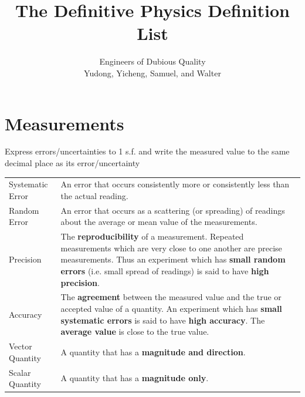 \documentclass[a4paper,11pt]{article}
\title{The Definitive Physics Definition List}
\author{Engineers of Dubious Quality\\Yudong, Yicheng, Samuel, and Walter}
\begin{document}
	
	\maketitle
	
	\section{Measurements}
	Express errors/uncertainties to 1 s.f. and write the measured value to the same decimal place as its error/uncertainty
	
	\begin{center}
		\renewcommand{\arraystretch}{1.5}
		\begin{tabular}{@{} l p{11.6cm} @{}}
			\toprule
			Systematic Error & An error that occurs consistently more or consistently less than the actual reading.\\
			Random Error & An error that occurs as a scattering (or spreading) of readings about the average or mean value of the measurements. \\
			\midrule
			Precision & The \textbf{reproducibility} of a measurement. Repeated measurements which are very close to one another are precise measurements. Thus an experiment which has \textbf{small random errors} (i.e. small spread of readings) is said to have \textbf{high precision}. \\
			Accuracy & The \textbf{agreement} between the measured value and the true or accepted value of a quantity. An experiment which has \textbf{small systematic errors} is said to have \textbf{high accuracy}. The \textbf{average value} is close to the true value. \\
			\midrule
			Vector Quantity & A quantity that has a \textbf{magnitude and direction}. \\
			Scalar Quantity & A quantity that has a \textbf{magnitude only}. \\
			\bottomrule
		\end{tabular}
	\end{center}
	
\end{document}
